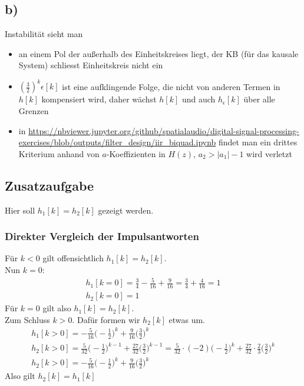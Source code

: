 \documentclass[11pt,a4paper,DIV=12]{scrartcl}
\begin{document}
\subsection{b)}
%
Instabilität sieht man
%
\begin{itemize}
	\item an einem Pol der außerhalb des Einheitskreises liegt, der KB (für das kausale System) schliesst Einheitskreis nicht ein
	\item $\left(\frac{3}{2}\right)^k \epsilon[k]$ ist eine aufklingende Folge, die nicht von anderen Termen in $h[k]$ kompensiert wird, daher wächst $h[k]$ und auch $h_\epsilon[k]$ über alle Grenzen
	\item in \url{https://nbviewer.jupyter.org/github/spatialaudio/digital-signal-processing-exercises/blob/outputs/filter_design/iir_biquad.ipynb}
	findet man ein drittes Kriterium anhand von $a$-Koeffizienten in $H(z)$, $a_2>|a_1|-1$ wird verletzt
\end{itemize}
%
\newpage
\subsection{Zusatzaufgabe}
%
Hier soll $h_1[k]=h_2[k]$ gezeigt werden.
%
\subsubsection{Direkter Vergleich der Impulsantworten}
%
Für $k<0$ gilt offensichtlich $h_1[k]=h_2[k]$.\\
%
Nun $k=0$:
%
\begin{gather}
	h_1[k=0]=\frac{3}{4}-\frac{5}{16}+\frac{9}{16}=\frac{3}{4}+\frac{4}{16}=1\\
	h_2[k=0]=1
\end{gather}
%
%
Für $k=0$ gilt also $h_1[k]=h_2[k]$.\\
%
Zum Schluss $k>0$. Dafür formen wir $h_2[k]$ etwas um.
%
%
\begin{gather}
	h_1[k>0]=-\frac{5}{16}\bigg (-\frac{1}{2}\bigg )^k+\frac{9}{16}\bigg (\frac{3}{2}\bigg )^k\\
	h_2[k>0]=\frac{5}{32}\bigg (-\frac{1}{2}\bigg )^{k-1}+\frac{27}{32}\bigg (\frac{3}{2}\bigg )^{k-1}
	=\frac{5}{32}\cdot(-2)\bigg (-\frac{1}{2}\bigg )^k+\frac{27}{32}\cdot\frac{2}{3}\bigg (\frac{3}{2}\bigg )^k\\
	h_2[k>0]=-\frac{5}{16}\bigg (-\frac{1}{2}\bigg )^k+\frac{9}{16}\bigg (\frac{3}{2}\bigg )^k
\end{gather}
%
%
Also gilt $h_2[k]=h_1[k]$
%
\end{document}

